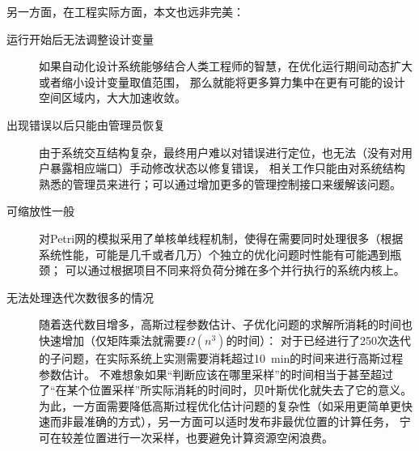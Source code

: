 \documentclass[index]{subfiles}
\begin{document}
另一方面，在工程实际方面，本文也远非完美：
\begin{description}
  \item[运行开始后无法调整设计变量] 如果自动化设计系统能够结合人类工程师的智慧，在优化运行期间动态扩大或者缩小设计变量取值范围，
  那么就能将更多算力集中在更有可能的设计空间区域内，大大加速收敛。
  \item[出现错误以后只能由管理员恢复] 由于系统交互结构复杂，最终用户难以对错误进行定位，也无法（没有对用户暴露相应端口）手动修改状态以修复错误，
  相关工作只能由对系统结构熟悉的管理员来进行；可以通过增加更多的管理控制接口来缓解该问题。
  \item[可缩放性一般] 对Petri网的模拟采用了单核单线程机制，使得在需要同时处理很多（根据系统性能，可能是几千或者几万）个独立的优化问题时性能有可能遇到瓶颈；
  可以通过根据项目不同来将负荷分摊在多个并行执行的系统内核上。
  \item[无法处理迭代次数很多的情况] 随着迭代数目增多，高斯过程参数估计、子优化问题的求解所消耗的时间也快速增加（仅矩阵乘法就需要$\Omega(n^3)$的时间）：
  对于已经进行了250次迭代的子问题，在实际系统上实测需要消耗超过\SI{10}{\minute}的时间来进行高斯过程参数估计。
  不难想象如果“判断应该在哪里采样”的时间相当于甚至超过了“在某个位置采样”所实际消耗的时间时，贝叶斯优化就失去了它的意义。
  为此，一方面需要降低高斯过程优化估计问题的复杂性（如采用更简单更快速而非最准确的方式），另一方面可以适时发布非最优位置的计算任务，
  宁可在较差位置进行一次采样，也要避免计算资源空闲浪费。
\end{description}
\end{document}
